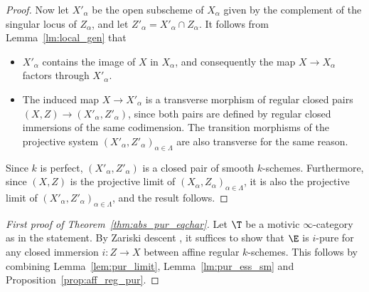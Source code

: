 \begin{num}
\begin{proof}
Now let $X'_\alpha$ be the open subscheme of $X_\alpha$ given by the complement of the singular locus of $Z_\alpha$, and let $Z'_\alpha=X'_\alpha\cap Z_\alpha$. It follows from Lemma~\ref{lm:local_gen} that
\begin{itemize}
\item $X'_\alpha$ contains the image of $X$ in $X_\alpha$, and consequently the map $X\to X_\alpha$ factors through $X'_\alpha$.
\item The induced map $X\to X'_\alpha$ is a transverse morphism of regular closed pairs $(X,Z)\to (X'_\alpha,Z'_\alpha)$, since both pairs are defined by regular closed immersions of the same codimension. The transition morphisms of the projective system $(X'_\alpha,Z'_\alpha)_{\alpha\in\Lambda}$ are also transverse for the same reason.
\end{itemize}
Since $k$ is perfect, $(X'_\alpha,Z'_\alpha)$ is a closed pair of smooth $k$-schemes. Furthermore, since $(X,Z)$ is the projective limit of $(X_\alpha,Z_\alpha)_{\alpha\in\Lambda}$, it is also the projective limit of $(X'_\alpha,Z'_\alpha)_{\alpha\in\Lambda}$, and the result follows.
\end{proof}

\begin{proof}[First proof of Theorem~\ref{thm:abs_pur_eqchar}]
Let $\T$ be a motivic $\infty$-category as in the statement.
By Zariski descent \cite[Prop.\,3.3.4]{CD3}, it suffices to show that $\E$ is $i$-pure for any closed immersion $i:Z\to X$ between affine regular $k$-schemes. This follows by combining Lemma~\ref{lem:pur_limit}, Lemma~\ref{lm:pur_ess_sm} and Proposition~\ref{prop:aff_reg_pur}.
\end{proof}
\end{num}

